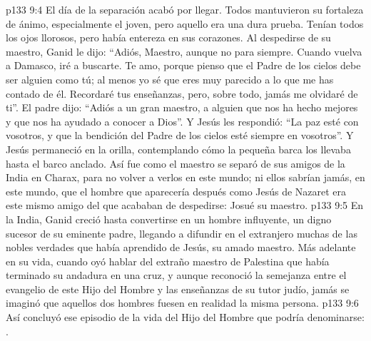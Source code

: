 \vs p133 9:4 \pc El día de la separación acabó por llegar. Todos mantuvieron su fortaleza de ánimo, especialmente el joven, pero aquello era una dura prueba. Tenían todos los ojos llorosos, pero había entereza en sus corazones. Al despedirse de su maestro, Ganid le dijo: “Adiós, Maestro, aunque no para siempre. Cuando vuelva a Damasco, iré a buscarte. Te amo, porque pienso que el Padre de los cielos debe ser alguien como tú; al menos yo sé que eres muy parecido a lo que me has contado de él. Recordaré tus enseñanzas, pero, sobre todo, jamás me olvidaré de ti”. El padre dijo: “Adiós a un gran maestro, a alguien que nos ha hecho mejores y que nos ha ayudado a conocer a Dios”. Y Jesús les respondió: “La paz esté con vosotros, y que la bendición del Padre de los cielos esté siempre en vosotros”. Y Jesús permaneció en la orilla, contemplando cómo la pequeña barca los llevaba hasta el barco anclado. Así fue como el maestro se separó de sus amigos de la India en Charax, para no volver a verlos en este mundo; ni ellos sabrían jamás, en este mundo, que el hombre que aparecería después como Jesús de Nazaret era este mismo amigo del que acababan de despedirse: Josué su maestro.
\vs p133 9:5 En la India, Ganid creció hasta convertirse en un hombre influyente, un digno sucesor de su eminente padre, llegando a difundir en el extranjero muchas de las nobles verdades que había aprendido de Jesús, su amado maestro. Más adelante en su vida, cuando oyó hablar del extraño maestro de Palestina que había terminado su andadura en una cruz, y aunque reconoció la semejanza entre el evangelio de este Hijo del Hombre y las enseñanzas de su tutor judío, jamás se imaginó que aquellos dos hombres fuesen en realidad la misma persona.
\vs p133 9:6 \pc Así concluyó ese episodio de la vida del Hijo del Hombre que podría denominarse: .
